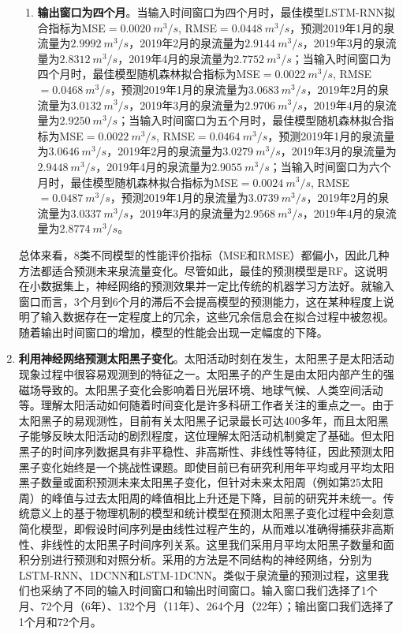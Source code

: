 \begin{enumerate}
\begin{enumerate}
      \item \textbf{输出窗口为四个月}。当输入时间窗口为四个月时，最佳模型LSTM-RNN拟合指标为MSE$=\SI{0.0020}{m^{3}/s}$, RMSE$=\SI{0.0448}{m^{3}/s}$，预测2019年1月的泉流量为$\SI{2.9992}{m^{3}/s}$，2019年2月的泉流量为$\SI{2.9144}{m^{3}/s}$，2019年3月的泉流量为$\SI{2.8312}{m^{3}/s}$，2019年4月的泉流量为$\SI{2.7752}{m^{3}/s}$；当输入时间窗口为四个月时，最佳模型随机森林拟合指标为MSE$=\SI{0.0022}{m^{3}/s}$, RMSE$=\SI{0.0468}{m^{3}/s}$，预测2019年1月的泉流量为$\SI{3.0683}{m^{3}/s}$，2019年2月的泉流量为$\SI{3.0132}{m^{3}/s}$，2019年3月的泉流量为$\SI{2.9706}{m^{3}/s}$，2019年4月的泉流量为$\SI{2.9250}{m^{3}/s}$；当输入时间窗口为五个月时，最佳模型随机森林拟合指标为MSE$=\SI{0.0022}{m^{3}/s}$, RMSE$=\SI{0.0464}{m^{3}/s}$，预测2019年1月的泉流量为$\SI{3.0646}{m^{3}/s}$，2019年2月的泉流量为$\SI{3.0279}{m^{3}/s}$，2019年3月的泉流量为$\SI{2.9448}{m^{3}/s}$，2019年4月的泉流量为$\SI{2.9055}{m^{3}/s}$；当输入时间窗口为六个月时，最佳模型随机森林拟合指标为MSE$=\SI{0.0024}{m^{3}/s}$, RMSE$=\SI{0.0487}{m^{3}/s}$，预测2019年1月的泉流量为$\SI{3.0739}{m^{3}/s}$，2019年2月的泉流量为$\SI{3.0337}{m^{3}/s}$，2019年3月的泉流量为$\SI{2.9568}{m^{3}/s}$，2019年4月的泉流量为$\SI{2.8774}{m^{3}/s}$。
    \end{enumerate}
  
    总体来看，8类不同模型的性能评价指标（MSE和RMSE）都偏小，因此几种方法都适合预测未来泉流量变化。尽管如此，最佳的预测模型是RF。这说明在小数据集上，神经网络的预测效果并一定比传统的机器学习方法好。就输入窗口而言，3个月到6个月的滞后不会提高模型的预测能力，这在某种程度上说明了输入数据存在一定程度上的冗余，这些冗余信息会在拟合过程中被忽视。随着输出时间窗口的增加，模型的性能会出现一定幅度的下降。
  
  
    \item \textbf{利用神经网络预测太阳黑子变化}。太阳活动时刻在发生，太阳黑子是太阳活动现象过程中很容易观测到的特征之一。太阳黑子的产生是由太阳内部产生的强磁场导致的。太阳黑子变化会影响着日光层环境、地球气候、人类空间活动等。理解太阳活动如何随着时间变化是许多科研工作者关注的重点之一。由于太阳黑子的易观测性，目前有关太阳黑子记录最长可达400多年，而且太阳黑子能够反映太阳活动的剧烈程度，这位理解太阳活动机制奠定了基础。但太阳黑子的时间序列数据具有非平稳性、非高斯性、非线性等特征，因此预测太阳黑子变化始终是一个挑战性课题。即使目前已有研究利用年平均或月平均太阳黑子数量或面积预测未来太阳黑子变化，但针对未来太阳周（例如第25太阳周）的峰值与过去太阳周的峰值相比上升还是下降，目前的研究并未统一。传统意义上的基于物理机制的模型和统计模型在预测太阳黑子变化过程中会刻意简化模型，即假设时间序列是由线性过程产生的，从而难以准确得捕获非高斯性、非线性的太阳黑子时间序列关系。这里我们采用月平均太阳黑子数量和面积分别进行预测和对照分析。采用的方法是不同结构的神经网络，分别为LSTM-RNN、1DCNN和LSTM-1DCNN。类似于泉流量的预测过程，这里我们也采纳了不同的输入时间窗口和输出时间窗口。输入窗口我们选择了1个月、72个月（6年）、132个月（11年）、264个月（22年）；输出窗口我们选择了1个月和72个月。
    

\end{enumerate}
